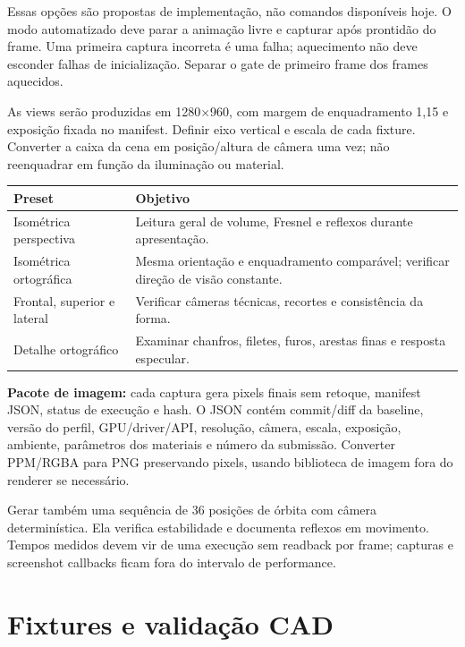 \documentclass[11pt,a4paper]{article}
\begin{document}
Essas opções são propostas de implementação, não comandos disponíveis hoje. O modo automatizado deve parar a animação livre e capturar após prontidão do frame. Uma primeira captura incorreta é uma falha; aquecimento não deve esconder falhas de inicialização. Separar o gate de primeiro frame dos frames aquecidos.

As views serão produzidas em 1280$\times$960, com margem de enquadramento 1,15 e exposição fixada no manifest. Definir eixo vertical e escala de cada fixture. Converter a caixa da cena em posição/altura de câmera uma vez; não reenquadrar em função da iluminação ou material.

\begin{center}\small
\begin{tabular}{P{.25\linewidth}P{.65\linewidth}}
\toprule Preset & Objetivo\\\midrule
Isométrica perspectiva & Leitura geral de volume, Fresnel e reflexos durante apresentação.\\
Isométrica ortográfica & Mesma orientação e enquadramento comparável; verificar direção de visão constante.\\
Frontal, superior e lateral & Verificar câmeras técnicas, recortes e consistência da forma.\\
Detalhe ortográfico & Examinar chanfros, filetes, furos, arestas finas e resposta especular.\\\bottomrule
\end{tabular}\end{center}

\textbf{Pacote de imagem:} cada captura gera pixels finais sem retoque, manifest JSON, status de execução e hash. O JSON contém commit/diff da baseline, versão do perfil, GPU/driver/API, resolução, câmera, escala, exposição, ambiente, parâmetros dos materiais e número da submissão. Converter PPM/RGBA para PNG preservando pixels, usando biblioteca de imagem fora do renderer se necessário.

Gerar também uma sequência de 36 posições de órbita com câmera determinística. Ela verifica estabilidade e documenta reflexos em movimento. Tempos medidos devem vir de uma execução sem readback por frame; capturas e screenshot callbacks ficam fora do intervalo de performance.

\section{Fixtures e validação CAD}
\end{document}
